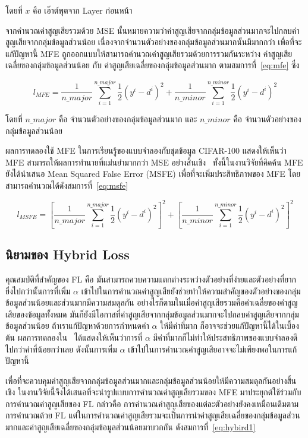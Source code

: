 โดยที่ $x$ คือ เอ๊าต์พุตจาก Layer ก่อนหน้า

จากคำนวณค่าสูญเสียรวมด้วย MSE นั้นหมายความว่าค่าสูญเสียจากกลุ่มข้อมูลส่วนมากจะไปกลบค่าสูญเสียจากกลุ่มข้อมูลส่วนน้อย เนื่องจากจำนวนตัวอย่างของกลุ่มข้อมูลส่วนมากนั้นมีมากกว่า เพื่อที่จะแก้ปัญหานี้ MFE ถูกออกแบบให้สามารถคำนวณค่าสูญเสียรวมด้วยการรวมกันระหว่าง ค่าสูญเสียเฉลี่ยของกลุ่มข้อมูลส่วนน้อย กับ ค่าสูญเสียเฉลี่ยของกลุ่มข้อมูลส่วนมาก ตามสมการที่~\ref{eq:mfe} ซึ่ง

\begin{equation} \label{eq:mfe}
    l_{MFE} = \frac{1}{n\_major}\sum_{i=1}^{n\_major}\frac{1}{2}(y^{i} - d^{i})^{2} +\frac{1}{n\_minor}\sum_{i=1}^{n\_minor}\frac{1}{2}(y^{i} - d^{i})^{2}
\end{equation}

โดยที่ $n\_major$ คือ จำนวนตัวอย่างของกลุ่มข้อมูลส่วนมาก และ $n\_minor$ คือ จำนวนตัวอย่างของกลุ่มข้อมูลส่วนน้อย

ผลการทดลองใช้ MFE ในการเรียนรู้ของแบบจำลองกับชุดข้อมูล CIFAR-100 แสดงให้เห็นว่า MFE สามารถให้ผลการทำนายที่แม่นยำมากกว่า MSE อย่างสิ้นเชิง~\cite{Wang:2016} ทั้งนี้ในงานวิจัยที่คิดค้น MFE ยังได้นำเสนอ Mean Squared False Error (MSFE) เพื่อที่จะเพิ่มประสิทธิภาพของ MFE โดยสามารถคำนวณได้ดังสมการที่~\ref{eq:msfe}

\begin{equation} \label{eq:msfe}
    l_{MSFE} = [\frac{1}{n\_major}\sum_{i=1}^{n\_major}\frac{1}{2}(y^{i} - d^{i})^{2}]^{2} +[\frac{1}{n\_minor}\sum_{i=1}^{n\_minor}\frac{1}{2}(y^{i} - d^{i})^{2}]^2
\end{equation}

\subsection{นิยามของ Hybrid Loss}
คุณสมบัติที่สำคัญของ FL คือ มันสามารถควบความแตกต่างระหว่างตัวอย่างที่ง่ายและตัวอย่างที่ยาก ยิ่งไปกว่านั้นการที่เพิ่ม $\alpha$ เข้าไปในการคำนวณค่าสูญเสียยังช่วยทำให้ความสำคัญของตัวอย่างของกลุ่มข้อมูลส่วนน้อยและส่วนมากมีความสมดุลกัน อย่างไรก็ตามในเมื่อค่าสูญเสียรวมคือค่าเฉลี่ยของค่าสูญเสียของข้อมูลทั้งหมด มันก็ยังมีโอกาสที่ค่าสูญเสียจากกลุ่มข้อมูลส่วนมากจะไปกลบค่าสูญเสียจากกลุ่มข้อมูลส่วนน้อย ถ้าเราแก้ปัญหาด้วยการกำหนดค่า $\alpha$ ให้มีค่าที่มาก ก็อาจจะช่วยแก้ปัญหานี้ได้ในเบื้องต้น ผลการทดลองใน~\cite{Lin:2017} ได้แสดงให้เห็นว่าการที่ $\alpha$ มีค่าที่มากก็ไม่ทำให้ประสทธิภาพของแบบจำลองดีไปกว่าค่าที่น้อยกว่าเลย ดังนั้นการเพิ่ม $\alpha$ เข้าไปในการคำนวณค่าสูญเสียอาจจะไม่เพียงพอในการแก้ปัญหานี้

เพื่อที่จะควบคุมค่าสูญเสียจากกลุ่มข้อมูลส่วนมากและกลุ่มข้อมูลส่วนน้อยให้มีความสมดุลกันอย่างสิ้นเชิง
ในงานวิจัยนี้จึงได้เสนอที่จะนำรูปแบบการคำนวณค่าสูญเสียรวมของ MFE มาประยุกต์ใช้ร่วมกับการคำนวณค่าสูญเสียของ FL กล่าวคือ การคำนวณค่าสูญเสียของแต่ละตัวอย่างยังคงเหมือนเดิมตามการคำนวณด้วย FL แต่ในการคำนวณค่าสูญเสียรวมจะเป็นการนำค่าสูญเสียเฉลี่ยของกลุ่มข้อมูลส่วนมากและค่าสูญเสียเฉลี่ยของกลุ่มข้อมูลส่วนน้อยมาบวกกัน ดังสมการที่~\ref{eq:hybird1}

